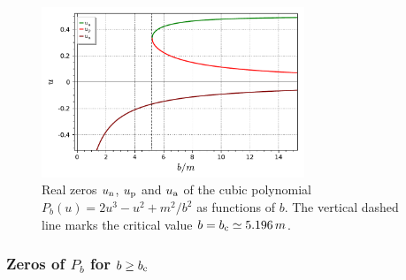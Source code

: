 \begin{figure}
\centerline{\includegraphics[width=0.7\textwidth]{gis_u_per_apo_neg.pdf}}
\caption[]{\label{f:gis:u_per_apo_neg} \footnotesize
Real zeros $u_{\rm n}$, $u_{\rm p}$ and $u_{\rm a}$ of the cubic polynomial
$P_b(u) =  2 u^3 - u^2 + {m^2}/{b^2}$ as functions of $b$. The vertical
dashed line marks the critical value
$b = b_{\rm c} \simeq 5.196\, m$.}
\end{figure}


\subsubsection{Zeros of $P_b$ for $b\geq b_{\rm c}$}

